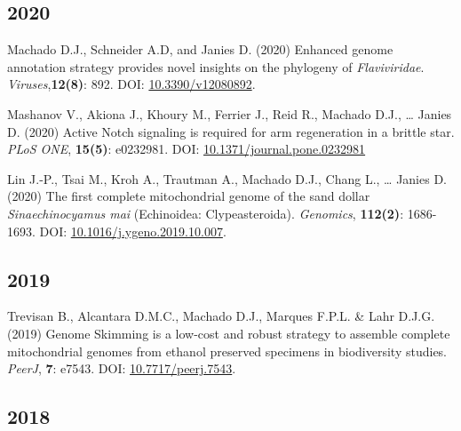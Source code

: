 \documentclass[11pt, letterpaper, sans]{moderncv}
\begin{document}

\subsection{2020}

    {\setlength{\parskip}{.5em}\renewcommand{\baselinestretch}{2.0}\begin{hangparas}{.25in}{1}

        Machado D.J., Schneider A.D, and Janies D. (2020) Enhanced genome annotation strategy provides novel insights on the phylogeny of \emph{Flaviviridae}. \emph{Viruses},\textbf{12(8)}: 892. DOI: \href{https://www.mdpi.com/1999-4915/12/8/892}{10.3390/v12080892}.

	    Mashanov V., Akiona J., Khoury M., Ferrier J., Reid R., Machado D.J., … Janies D. (2020) Active Notch signaling is required for arm regeneration in a brittle star. \emph{PLoS ONE}, \textbf{15(5)}: e0232981. DOI: \href{https://doi.org/10.1371/journal.pone.0232981}{10.1371/journal.pone.0232981}

	    Lin J.-P., Tsai M., Kroh A., Trautman A., Machado D.J., Chang L., … Janies D. (2020) The first complete mitochondrial genome of the sand dollar \emph{Sinaechinocyamus mai} (Echinoidea: Clypeasteroida). \emph{Genomics}, \textbf{112(2)}: 1686-1693. DOI: \href{https://doi.org/10.1016/j.ygeno.2019.10.007}{10.1016/j.ygeno.2019.10.007}.

	\end{hangparas}}


\subsection{2019}

    {\setlength{\parskip}{.5em}\renewcommand{\baselinestretch}{2.0}\begin{hangparas}{.25in}{1}
		Trevisan B., Alcantara D.M.C., Machado D.J., Marques F.P.L. \& Lahr D.J.G. (2019) Genome Skimming is a low-cost and robust strategy to assemble complete mitochondrial genomes from ethanol preserved specimens in biodiversity studies. \emph{PeerJ}, \textbf{7}: e7543. DOI: \href{https://doi.org/10.7717/peerj.7543}{10.7717/peerj.7543}.
	\end{hangparas}}


\subsection{2018}
\end{document}
